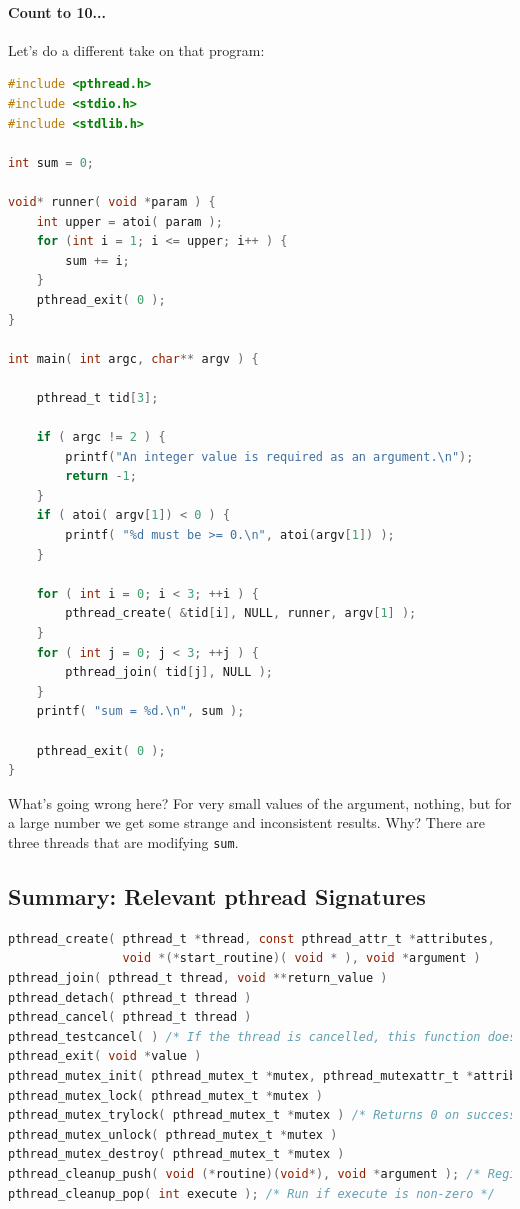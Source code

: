 \documentclass[a4paper]{report}
\begin{document}
\begin{appendices}
\paragraph{Count to 10...}

Let's do a different take on that program:

\begin{lstlisting}[language=C]
#include <pthread.h>
#include <stdio.h>
#include <stdlib.h>

int sum = 0;

void* runner( void *param ) {
    int upper = atoi( param );
    for (int i = 1; i <= upper; i++ ) {
        sum += i;
    }
    pthread_exit( 0 );
}

int main( int argc, char** argv ) { 

    pthread_t tid[3];

    if ( argc != 2 ) {
        printf("An integer value is required as an argument.\n");
        return -1; 
    }   
    if ( atoi( argv[1]) < 0 ) {
        printf( "%d must be >= 0.\n", atoi(argv[1]) );
    }   

    for ( int i = 0; i < 3; ++i ) { 
        pthread_create( &tid[i], NULL, runner, argv[1] );
    }   
    for ( int j = 0; j < 3; ++j ) { 
        pthread_join( tid[j], NULL );
    }   
    printf( "sum = %d.\n", sum );
    
    pthread_exit( 0 );
}
\end{lstlisting}

What's going wrong here? For very small values of the argument, nothing, but for a large number we get some strange and inconsistent results. Why? There are three threads that are modifying \texttt{sum}.

\subsection*{Summary: Relevant pthread Signatures}

\begin{lstlisting}[language=C]
pthread_create( pthread_t *thread, const pthread_attr_t *attributes,
                void *(*start_routine)( void * ), void *argument )
pthread_join( pthread_t thread, void **return_value )
pthread_detach( pthread_t thread )
pthread_cancel( pthread_t thread )
pthread_testcancel( ) /* If the thread is cancelled, this function does not return (thread terminated) */
pthread_exit( void *value )
pthread_mutex_init( pthread_mutex_t *mutex, pthread_mutexattr_t *attributes )
pthread_mutex_lock( pthread_mutex_t *mutex )
pthread_mutex_trylock( pthread_mutex_t *mutex ) /* Returns 0 on success */
pthread_mutex_unlock( pthread_mutex_t *mutex )
pthread_mutex_destroy( pthread_mutex_t *mutex )
pthread_cleanup_push( void (*routine)(void*), void *argument ); /* Register cleanup handler, with argument */ 
pthread_cleanup_pop( int execute ); /* Run if execute is non-zero */ 


\end{lstlisting}
\end{appendices}
\end{document}
